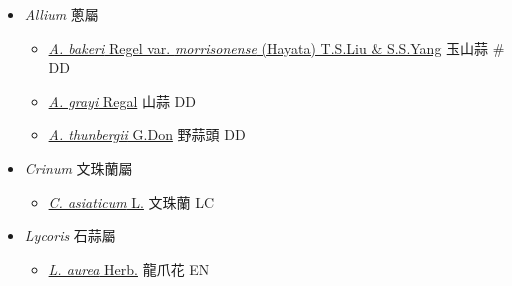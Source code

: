 
  \begin{itemize}
 \item[] \textit{Allium} 蔥屬
                                
  \begin{itemize}
        \item[] \href{http://www.theplantlist.org/tpl1.1/search?q=Allium+bakeri+var.+morrisonense}{\textit{A. bakeri} Regel var. \textit{morrisonense} (Hayata) T.S.Liu \& S.S.Yang}   玉山蒜  \# DD
        \item[] \href{http://www.theplantlist.org/tpl1.1/search?q=Allium+grayi}{\textit{A. grayi} Regal}   山蒜   DD
        \item[] \href{http://www.theplantlist.org/tpl1.1/search?q=Allium+thunbergii}{\textit{A. thunbergii} G.Don}   野蒜頭   DD
  \end{itemize}
 \item[] \textit{Crinum} 文珠蘭屬
                                
  \begin{itemize}
        \item[] \href{http://www.theplantlist.org/tpl1.1/search?q=Crinum+asiaticum}{\textit{C. asiaticum} L.}   文珠蘭   LC
  \end{itemize}
 \item[] \textit{Lycoris} 石蒜屬
                                
  \begin{itemize}
        \item[] \href{http://www.theplantlist.org/tpl1.1/search?q=Lycoris+aurea}{\textit{L. aurea} Herb.}   龍爪花   EN
  \end{itemize}
  \end{itemize}
